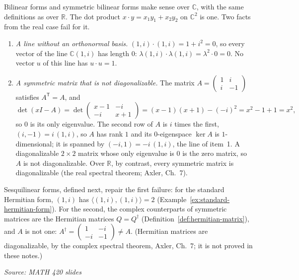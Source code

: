 \documentclass[11pt]{report}
\newcommand{\srcline}[1]{\par\hfill{\footnotesize\textit{Source: #1}}}
\begin{document}
\begin{exbox}\label{ex:complex-dot-product}
Bilinear forms and symmetric bilinear forms make sense over $\mathbb{C}$, with the same definitions as over $\mathbb{R}$. The dot product $x \cdot y = x_1 y_1 + x_2 y_2$ on $\mathbb{C}^2$ is one. Two facts from the real case fail for it.
\begin{enumerate}
    \item \emph{A line without an orthonormal basis.} $(1, i) \cdot (1, i) = 1 + i^2 = 0$, so every vector of the line $\mathbb{C}(1, i)$ has length $0$: $\lambda(1, i) \cdot \lambda(1, i) = \lambda^2 \cdot 0 = 0$. No vector $u$ of this line has $u \cdot u = 1$.
    \item \emph{A symmetric matrix that is not diagonalizable.} The matrix $A = \begin{pmatrix} 1 & i \\ i & -1 \end{pmatrix}$ satisfies $A^{\mathsf{T}} = A$, and
    \[ \det(xI - A) = \det\begin{pmatrix} x - 1 & -i \\ -i & x + 1 \end{pmatrix} = (x - 1)(x + 1) - (-i)^2 = x^2 - 1 + 1 = x^2, \]
    so $0$ is its only eigenvalue. The second row of $A$ is $i$ times the first, $(i, -1) = i\,(1, i)$, so $A$ has rank $1$ and its $0$-eigenspace $\ker A$ is $1$-dimensional; it is spanned by $(-i, 1) = -i\,(1, i)$, the line of item~1. A diagonalizable $2 \times 2$ matrix whose only eigenvalue is $0$ is the zero matrix, so $A$ is not diagonalizable. Over $\mathbb{R}$, by contrast, every symmetric matrix is diagonalizable (the real spectral theorem; Axler, Ch.~7).
\end{enumerate}
Sesquilinear forms, defined next, repair the first failure: for the standard Hermitian form, $(1, i)$ has $\langle (1, i), (1, i) \rangle = 2$ (Example~\ref{ex:standard-hermitian-form}). For the second, the complex counterparts of symmetric matrices are the Hermitian matrices $Q = Q^\dagger$ (Definition~\ref{def:hermitian-matrix}), and $A$ is not one: $A^\dagger = \begin{pmatrix} 1 & -i \\ -i & -1 \end{pmatrix} \neq A$. (Hermitian matrices are diagonalizable, by the complex spectral theorem, Axler, Ch.~7; it is not proved in these notes.)
\srcline{MATH 420 slides}
\end{exbox}
\end{document}
